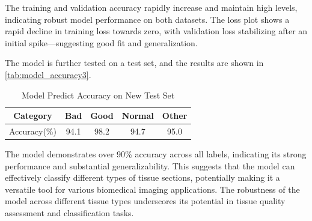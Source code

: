 The training and validation accuracy rapidly increase and maintain high levels, indicating robust model performance on both datasets. The loss plot shows a rapid decline in training loss towards zero, with validation loss stabilizing after an initial spike—suggesting good fit and generalization.

The model is further tested on a test set, and the results are shown in \autoref{tab:model_accuracy3}.


\begin{table}[H]
    \centering
    \caption{Model Predict Accuracy on New Test Set}
    \begin{tabular}{c*{4}{c}}
        \toprule
        Category & Bad & Good & Normal & Other \\
        \midrule
        Accuracy(\%) & 94.1 & 98.2 & 94.7 & 95.0 \\
        \bottomrule
    \end{tabular}
    \label{tab:model_accuracy3}
\end{table}

The model demonstrates over 90\% accuracy across all labels, indicating its strong performance and substantial generalizability. This suggests that the model can effectively classify different types of tissue sections, potentially making it a versatile tool for various biomedical imaging applications.
The robustness of the model across different tissue types underscores its potential in tissue quality assessment and classification tasks.

